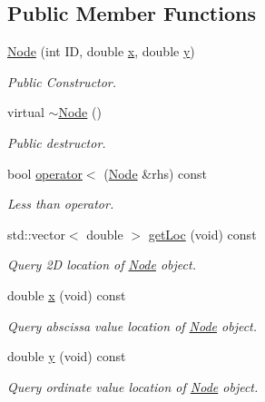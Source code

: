 \subsection*{Public Member Functions}
\begin{DoxyCompactItemize}
\item 
\mbox{\hyperlink{class_node_a75560296eb48863988f31c8adf370dcf}{Node}} (int ID, double \mbox{\hyperlink{class_node_a05d427a6fef833a49306b2adb52ef722}{x}}, double \mbox{\hyperlink{class_node_a5a06c0e486aa39a994b6a2fa674aa493}{y}})
\begin{DoxyCompactList}\small\item\em Public Constructor. \end{DoxyCompactList}\item 
virtual \mbox{\hyperlink{class_node_aa0840c3cb5c7159be6d992adecd2097c}{$\sim$\+Node}} ()
\begin{DoxyCompactList}\small\item\em Public destructor. \end{DoxyCompactList}\item 
bool \mbox{\hyperlink{class_node_aeda47a1decedb8fc3835579d75b7d65f}{operator$<$}} (\mbox{\hyperlink{class_node}{Node}} \&rhs) const
\begin{DoxyCompactList}\small\item\em Less than operator. \end{DoxyCompactList}\item 
std\+::vector$<$ double $>$ \mbox{\hyperlink{class_node_ae59cc8d62b6cfa623252b98341c3084c}{get\+Loc}} (void) const
\begin{DoxyCompactList}\small\item\em Query 2D location of \mbox{\hyperlink{class_node}{Node}} object. \end{DoxyCompactList}\item 
double \mbox{\hyperlink{class_node_a05d427a6fef833a49306b2adb52ef722}{x}} (void) const
\begin{DoxyCompactList}\small\item\em Query abscissa value location of \mbox{\hyperlink{class_node}{Node}} object. \end{DoxyCompactList}\item 
double \mbox{\hyperlink{class_node_a5a06c0e486aa39a994b6a2fa674aa493}{y}} (void) const
\begin{DoxyCompactList}\small\item\em Query ordinate value location of \mbox{\hyperlink{class_node}{Node}} object. \end{DoxyCompactList}\end{DoxyCompactItemize}
